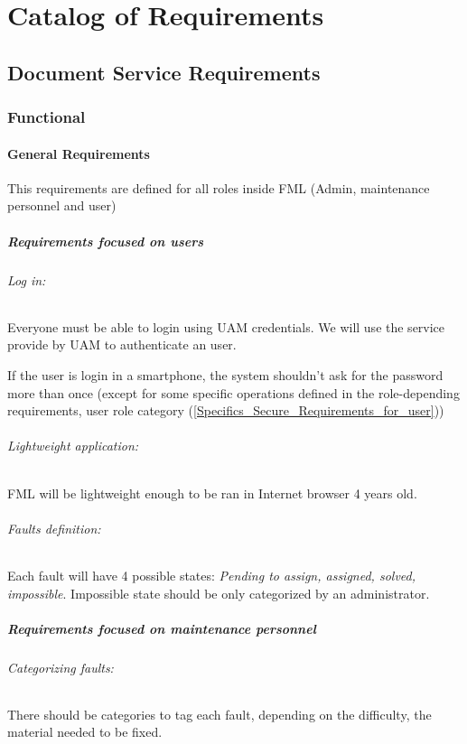 \documentclass{report}
\begin{document}
\chapter{Catalog of Requirements}

\section{Document Service Requirements}

\subsection{Functional}

\subsubsection{General Requirements}

This requirements are defined for all roles inside FML (Admin, maintenance personnel and user)

\paragraph{Requirements focused on users}


\subparagraph{Log in: } Everyone must be able to login using UAM credentials. We will use the service provide by UAM to authenticate an user.

If the user is login in a smartphone, the system shouldn't ask for the password more than once (except for some specific operations defined in the role-depending requirements, user role category (\ref{Specifics_Secure_Requirements_for_user}))

\subparagraph{Lightweight application: } FML will be lightweight enough to be ran in Internet browser 4 years old. 

\subparagraph{Faults definition: } Each fault will have 4 possible states: \textit{Pending to assign, assigned, solved, impossible}. Impossible state should be only categorized by an administrator. 

\paragraph{Requirements focused on maintenance personnel}

\subparagraph{Categorizing faults: } There should be categories to tag each fault, depending on the difficulty, the material needed to be fixed.
\end{document}
